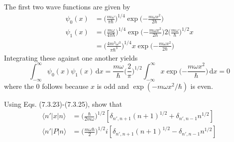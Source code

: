 \documentclass[../principles-of-quantum-mechanics.tex]{subfiles}
\begin{document}
\begin{questions}
\begin{solution}
			The first two wave functions are given by
			\begin{align*}
				\psi_0(x) &= \Big(\frac{m\omega}{\pi\hbar}\Big)^{1/4}\exp\Big({-\frac{m\omega x^2}{2\hbar}}\Big) \\
				\psi_1(x) &= \Big(\frac{m\omega}{4\pi\hbar}\Big)^{1/4}\exp\Big({-\frac{m\omega x^2}{2\hbar}}\Big)2\Big(\frac{m\omega}{\hbar}\Big)^{1/2}x \\
				&= \Big(\frac{4m^3\omega^3}{\pi\hbar^3}\Big)^{1/4}x\exp\Big({-\frac{m\omega x^2}{2\hbar}}\Big) 
			\end{align*}
			Integrating these against one another yields
			$$\int_{-\infty}^{\infty}\psi_0(x)\psi_1(x)\,\mathrm{d}x = \frac{m\omega}{\hbar}\Big(\frac{2}{\pi}\Big)^{1/2}\int_{-\infty}^{\infty}x\exp\Big({-\frac{m\omega x^2}{\hbar}}\Big)\,\mathrm{d}x = 0$$
			where the $0$ follows because $x$ is odd and $\exp(-m\omega x^2/\hbar)$ is even.
		\end{solution}
		
		\question Using Eqs. (7.3.23)-(7.3.25), show that
		\begin{align*}
			\langle n'|x|n\rangle &= \Big(\frac{\hbar}{2m\omega}\Big)^{1/2}[\delta_{n', n+1}(n + 1)^{1/2} + \delta_{n', n -1}n^{1/2}] \\
			\langle n'|P|n\rangle &= \Big(\frac{m\omega\hbar}{2}\Big)^{1/2}i[\delta_{n',n+1}(n+1)^{1/2} - \delta_{n',n - 1}n^{1/2}]
		\end{align*}
	

\end{questions}
\end{document}
